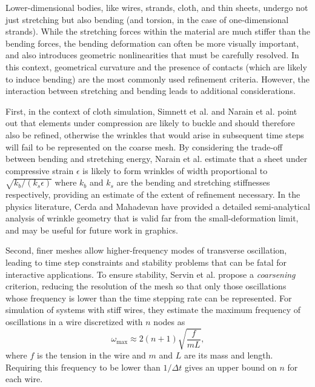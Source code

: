 Lower-dimensional bodies, like wires, strands, cloth, and thin sheets, undergo not just stretching but also bending (and torsion, in the case of one-dimensional strands).
While the stretching forces within the material are much stiffer than the bending forces, the bending deformation can often be more visually important, and also introduces geometric nonlinearities that must be carefully resolved.
In this context, geometrical curvature and the presence of contacts (which are likely to induce bending) are the most commonly used refinement criteria.
However, the interaction between stretching and bending leads to additional considerations.


First, in the context of cloth simulation, Simnett et al. \cite{Simnett2009} and Narain et al. \cite{Narain2012} point out that elements under compression are likely to buckle and should therefore also be refined, otherwise the wrinkles that would arise in subsequent time steps will fail to be represented on the coarse mesh.
By considering the trade-off between bending and stretching energy, Narain et al. estimate that a sheet under compressive strain $\epsilon$ is likely to form wrinkles of width proportional to $\sqrt{k_b/(k_s\epsilon)}$ where $k_b$ and $k_s$ are the bending and stretching stiffnesses respectively, providing an estimate of the extent of refinement necessary.
In the physics literature, Cerda and Mahadevan \cite{Cerda2003} have provided a detailed semi-analytical analysis of wrinkle geometry that is valid far from the small-deformation limit, and may be useful for future work in graphics.

Second, finer meshes allow higher-frequency modes of transverse oscillation, leading to time step constraints and stability problems that can be fatal for interactive applications.
To ensure stability, Servin et al. \cite{Servin2008} propose a \emph{coarsening} criterion, reducing the resolution of the mesh so that only those oscillations whose frequency is lower than the time stepping rate can be represented.
For simulation of systems with stiff wires, they estimate the maximum frequency of oscillations in a wire discretized with $n$ nodes as
\begin{equation}
	\omega_{\max} \approx 2(n+1)\sqrt{\frac{f}{mL}},
\end{equation}
where $f$ is the tension in the wire and $m$ and $L$ are its mass and length.
Requiring this frequency to be lower than $1/\Delta t$ gives an upper bound on $n$ for each wire.

